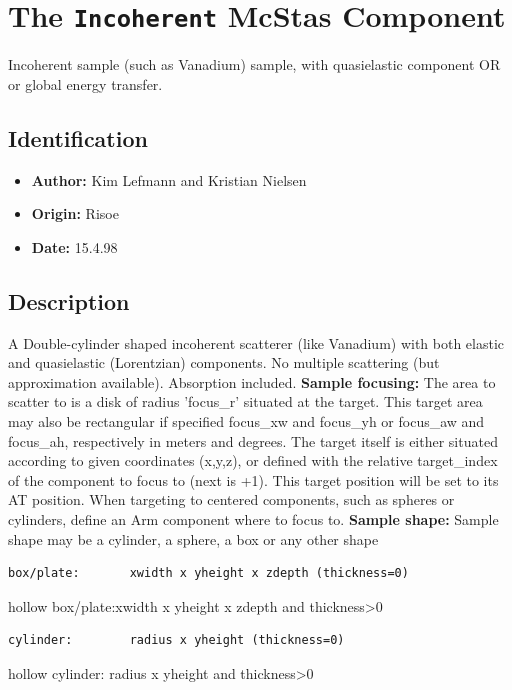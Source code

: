 \section{The \texttt{Incoherent} McStas Component}
Incoherent sample (such as Vanadium) sample, with quasielastic component OR or global energy transfer.

\subsection*{Identification}
\begin{itemize}
  \item \textbf{Author:} Kim Lefmann and Kristian Nielsen
  \item \textbf{Origin:} Risoe
  \item \textbf{Date:} 15.4.98
\end{itemize}

\subsection*{Description}
A Double-cylinder shaped incoherent scatterer (like Vanadium) with both elastic and quasielastic (Lorentzian) components. No multiple scattering (but approximation available). Absorption included. \textbf{Sample focusing:} The area to scatter to is a disk of radius 'focus\_r' situated at the target. This target area may also be rectangular if specified focus\_xw and focus\_yh or focus\_aw and focus\_ah, respectively in meters and degrees. The target itself is either situated according to given coordinates (x,y,z), or defined with the relative target\_index of the component to focus to (next is +1). This target position will be set to its AT position. When targeting to centered components, such as spheres or cylinders, define an Arm component where to focus to. \textbf{Sample shape:} Sample shape may be a cylinder, a sphere, a box or any other shape

\begin{verbatim}
box/plate:       xwidth x yheight x zdepth (thickness=0)
\end{verbatim}

hollow box/plate:xwidth x yheight x zdepth and thickness\textgreater{}0

\begin{verbatim}
cylinder:        radius x yheight (thickness=0)
\end{verbatim}

hollow cylinder: radius x yheight and thickness\textgreater{}0

